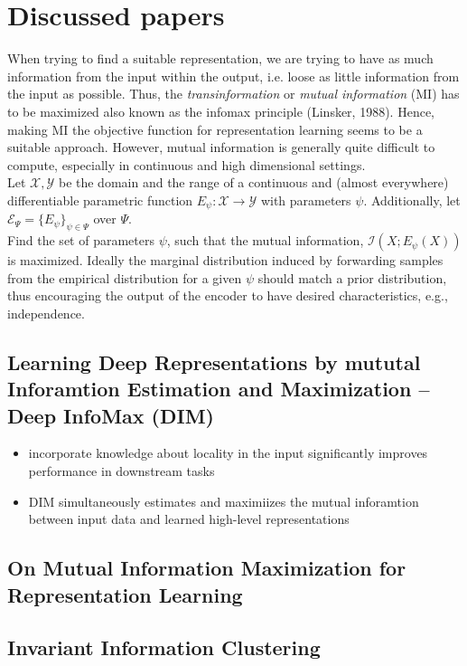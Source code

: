 \documentclass[]{article}
\begin{document}
\section{Discussed papers}
When trying to find a suitable representation, we are trying to have as much information from the input within the output, i.e. loose as little information from the input as possible. Thus, the \textit{transinformation} or \textit{mutual information} (MI) has to be maximized also known as the infomax principle (Linsker, 1988). Hence, making MI the objective function for representation learning seems to be a suitable approach. However,  mutual information is generally quite difficult to compute, especially in continuous and high dimensional settings.\\
Let $\mathcal{X}, \mathcal{Y}$ be the domain and the range of a continuous and (almost everywhere) differentiable parametric function
$E_\psi:\mathcal{X}\rightarrow\mathcal{Y}$ with parameters $\psi$. Additionally, let $\mathcal{E}_\Psi=\{E_\psi\}_{\psi\in\Psi}$ over $\Psi$. \\
Find the set of parameters $\psi$, such that the mutual information, $\mathcal{I}(X;E_\psi(X))$ is maximized. Ideally the marginal distribution induced by forwarding samples from the empirical distribution for a given $\psi$ should match a prior distribution, thus encouraging the output of the encoder to have desired characteristics, e.g., independence.
\subsection{Learning Deep Representations by mututal Inforamtion Estimation and Maximization -- Deep InfoMax (DIM)}
\begin{itemize}
	\item incorporate knowledge about locality in the input significantly improves performance in downstream tasks
	\item DIM simultaneously estimates and maximiizes the mutual inforamtion between input data and learned high-level representations
\end{itemize} 


\subsection{On Mutual Information Maximization for Representation Learning}

\subsection{Invariant Information Clustering}
\end{document}
